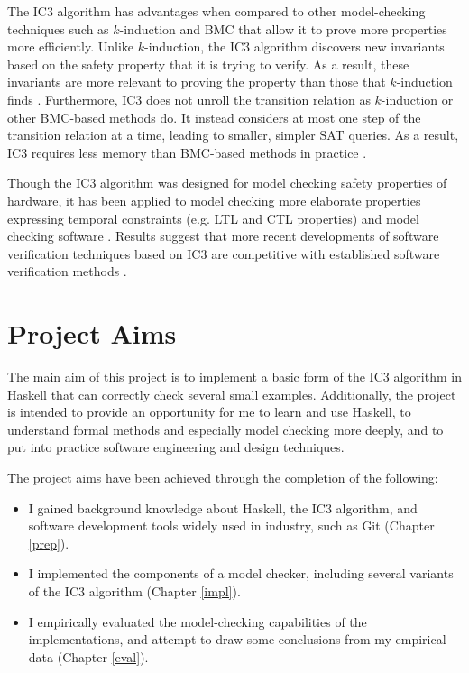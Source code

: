 \documentclass[12pt,a4paper,twoside,openright]{report}
\begin{document}
The IC3 algorithm has advantages when compared to other model-checking
techniques such as $k$-induction and BMC that allow it to prove more
properties more efficiently. Unlike $k$-induction, the IC3 algorithm
discovers new invariants based on the safety property that it is trying to
verify. As a result, these
invariants are more relevant to proving the property than those that
$k$-induction finds \cite{bradley12}.
Furthermore, IC3 does not unroll the transition relation as $k$-induction
or other BMC-based methods do. It instead considers at most one step
of the transition relation at a time, leading to smaller,
simpler SAT queries. As a result, IC3 requires less memory than BMC-based
methods in practice \cite{bradley12}.


Though the IC3 algorithm was designed for model checking safety properties of hardware,
it has been applied to model checking more
elaborate properties expressing temporal constraints (e.g. LTL and CTL
properties) and model checking software
\cite{bradley12,cimatti12}.
Results suggest that more recent developments of software verification
techniques based on IC3 are competitive with
established software verification methods \cite{birgmeier14}.

\section{Project Aims}

The main aim of this project is to implement a basic form of the IC3 algorithm in
Haskell that can correctly check several
small examples. Additionally, the project is intended to provide an opportunity
for me to learn and use Haskell, to understand formal methods and especially model
checking more deeply, and to put into practice software engineering and design techniques.

The project aims have been achieved through the completion of the following:
\begin{itemize}
\item I gained background knowledge about Haskell, the IC3 algorithm, and software
development tools widely used in industry, such as Git (Chapter \ref{prep}).
\item I implemented the components of a model checker, including several variants of
the IC3 algorithm (Chapter \ref{impl}).
\item I empirically evaluated the model-checking capabilities of the implementations,
and attempt to draw some conclusions from my empirical data
(Chapter \ref{eval}).
\end{itemize}
\end{document}
